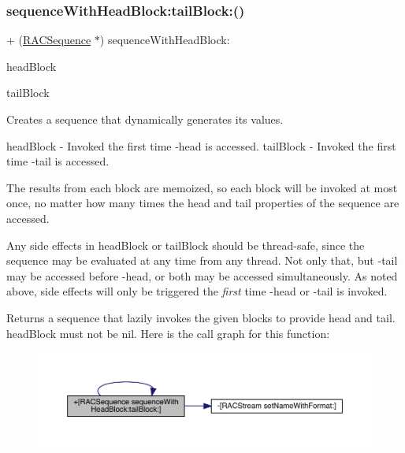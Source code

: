 \subsubsection{\texorpdfstring{sequence\+With\+Head\+Block\+:tail\+Block\+:()}{sequenceWithHeadBlock:tailBlock:()}\hspace{0.1cm}{\footnotesize\ttfamily [2/3]}}
{\footnotesize\ttfamily + (\mbox{\hyperlink{interface_r_a_c_sequence}{R\+A\+C\+Sequence}} $\ast$) sequence\+With\+Head\+Block\+: \begin{DoxyParamCaption}\item[{(id($^\wedge$)(void))}]{head\+Block }\item[{tailBlock:(\mbox{\hyperlink{interface_r_a_c_sequence}{R\+A\+C\+Sequence}} $\ast$($^\wedge$)(void))}]{tail\+Block }\end{DoxyParamCaption}}

Creates a sequence that dynamically generates its values.

head\+Block -\/ Invoked the first time -\/head is accessed. tail\+Block -\/ Invoked the first time -\/tail is accessed.

The results from each block are memoized, so each block will be invoked at most once, no matter how many times the head and tail properties of the sequence are accessed.

Any side effects in {\ttfamily head\+Block} or {\ttfamily tail\+Block} should be thread-\/safe, since the sequence may be evaluated at any time from any thread. Not only that, but -\/tail may be accessed before -\/head, or both may be accessed simultaneously. As noted above, side effects will only be triggered the {\itshape first} time -\/head or -\/tail is invoked.

Returns a sequence that lazily invokes the given blocks to provide head and tail. {\ttfamily head\+Block} must not be nil. Here is the call graph for this function\+:\nopagebreak
\begin{figure}[H]
\begin{center}
\leavevmode
\includegraphics[width=350pt]{interface_r_a_c_sequence_a20ccbd1419a168a74a10a83dfa88e62e_cgraph}
\end{center}
\end{figure}
\mbox{\label{interface_r_a_c_sequence_a20ccbd1419a168a74a10a83dfa88e62e}} 
